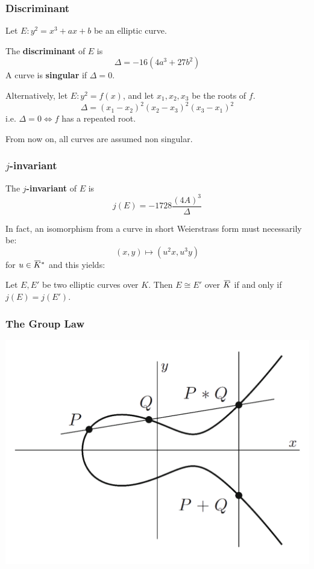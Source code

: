 \documentclass{beamer}
\newcommand{\overbar}[1]{\mkern 1.5mu\overline{\mkern-1.5mu#1\mkern-1.5mu}\mkern 1.5mu}
\begin{document}
\begin{frame}
    \frametitle{Discriminant}
    \begin{definition}
        Let $E: y^2 = x^3 + a x + b$ be an elliptic curve.

        The \textbf{discriminant} of $E$ is 
            \[ \Delta = -16 (4 a^3 + 27 b^2) \] 
        A curve is \textbf{singular} if $\Delta = 0$.
   \end{definition}
   \pause
    Alternatively, let $E: y^2 = f(x)$, and let $x_1, x_2, x_3$ be the roots of $f$. 
    \[ \Delta = (x_1 - x_2)^2(x_2 - x_3)^2(x_3 - x_1)^2 \]
    i.e. $\Delta = 0 \iff f$ has a repeated root.

    \pause
    From now on, all curves are assumed non singular.
    
\end{frame}

\begin{frame}
    \frametitle{$j$-invariant}
    \begin{definition}
         The $j$\textbf{-invariant} of $E$ is
            \[ j(E) = -1728 \frac{(4 A)^3}{\Delta} \]
    \end{definition} 
    \pause
    In fact, an isomorphism from a curve in short Weierstrass form must necessarily be:
    \[ (x, y) \mapsto (u^2 x, u^3 y) \]
    for $u \in \overbar{K}^*$ 
    \pause 
    and this yields:
     \begin{theorem}
        Let $E, E'$ be two elliptic curves over $K$. Then $E \cong E'$ over $\overbar{K}$ if and only if $j(E) = j(E')$. 
    \end{theorem}  
\end{frame}

\begin{frame}
    \frametitle{The Group Law} 
    \begin{center}
        \includegraphics[width=20 em]{group_law.png}
    \end{center}
\end{frame}
\end{document}
